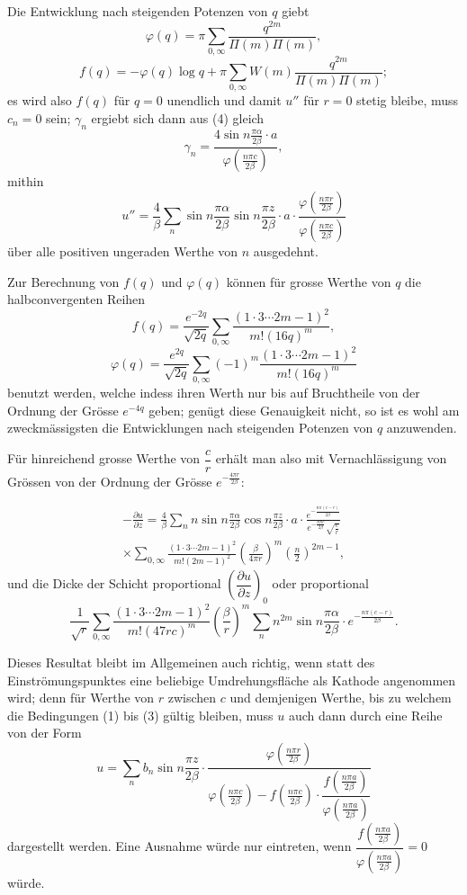 \documentclass[12pt,a4paper]{article}
\begin{document}
Die Entwicklung nach steigenden Potenzen von $q$ giebt
\[
\varphi(q) = \pi \sum_{0,\infty} \frac{q^{2m}}{\Pi(m)\Pi(m)},
\]
\[
f(q) = -\varphi(q) \log q + \pi \sum_{0,\infty} W(m) \frac{q^{2m}}{\Pi(m)\Pi(m)};
\]
es wird also $f(q)$ für $q = 0$ unendlich und damit $u''$ für $r = 0$ stetig bleibe, muss $c_n = 0$ sein; $\gamma_n$ ergiebt sich dann aus (4) gleich
\[
\gamma_n = \frac{4 \sin n\frac{\pi \alpha}{2\beta} \cdot a}{\varphi\left(\frac{n\pi c}{2\beta}\right)},
\]
mithin
\[
u'' = \frac{4}{\beta} \sum_n \sin n\frac{\pi \alpha}{2\beta} \sin n\frac{\pi z}{2\beta} \cdot a \cdot \frac{\varphi\left(\frac{n\pi r}{2\beta}\right)}{\varphi\left(\frac{n\pi c}{2\beta}\right)}
\]
über alle positiven ungeraden Werthe von $n$ ausgedehnt.

Zur Berechnung von $f(q)$ und $\varphi(q)$ können für grosse Werthe von $q$ die halbconvergenten Reihen
\[
f(q) = \frac{e^{-2q}}{\sqrt{2q}} \sum_{0,\infty} \frac{(1 \cdot 3 \cdots 2m - 1)^2}{m! (16q)^m},
\]
\[
\varphi(q) = \frac{e^{2q}}{\sqrt{2q}} \sum_{0,\infty} (-1)^m \frac{(1 \cdot 3 \cdots 2m - 1)^2}{m! (16q)^m}
\]
benutzt werden, welche indess ihren Werth nur bis auf Bruchtheile von der Ordnung der Grösse $e^{-4q}$ geben; genügt diese Genauigkeit nicht, so ist es wohl am zweckmässigsten die Entwicklungen nach steigenden Potenzen von $q$ anzuwenden.

Für hinreichend grosse Werthe von $\dfrac{c}{r}$ erhält man also mit Vernachlässigung von Grössen von der Ordnung der Grösse $e^{-\frac{4\pi r}{2\beta}}$:

\begin{multline*}
-\frac{\partial u}{\partial z} = \frac{4}{\beta} \sum_n n \sin n\frac{\pi \alpha}{2\beta} \cos n\frac{\pi z}{2\beta} \cdot a \cdot \frac{e^{-\frac{n\pi(c-r)}{2\beta}}}{e^{-\frac{n\pi c}{2\beta}} \sqrt{\frac{c}{r}}}\\
\times \sum_{0,\infty} \frac{(1 \cdot 3 \cdots 2m - 1)^2}{m! (2m - 1)^2} \left(\frac{\beta}{4\pi r}\right)^m \left(\frac{n}{2}\right)^{2m-1},
\end{multline*}
und die Dicke der Schicht proportional $\left(\dfrac{\partial u}{\partial z}\right)_0$ oder proportional
\[
\frac{1}{\sqrt{r}} \sum_{0,\infty} \frac{(1 \cdot 3 \cdots 2m - 1)^2}{m! (47rc)^m} \left(\frac{\beta}{r}\right)^m \sum_n n^{2m} \sin n\frac{\pi \alpha}{2\beta} \cdot e^{-\frac{n\pi(c-r)}{2\beta}}.
\]

Dieses Resultat bleibt im Allgemeinen auch richtig, wenn statt des Einströmungspunktes eine beliebige Umdrehungsfläche als Kathode angenommen wird; denn für Werthe von $r$ zwischen $c$ und demjenigen Werthe, bis zu welchem die Bedingungen (1) bis (3) gültig bleiben, muss $u$ auch dann durch eine Reihe von der Form
\[
u = \sum_n b_n \sin n\frac{\pi z}{2\beta} \cdot \frac{\varphi\left(\frac{n\pi r}{2\beta}\right)}{\varphi\left(\frac{n\pi c}{2\beta}\right) - f\left(\frac{n\pi c}{2\beta}\right) \cdot \dfrac{f\left(\frac{n\pi a}{2\beta}\right)}{\varphi\left(\frac{n\pi a}{2\beta}\right)}}
\]
dargestellt werden. Eine Ausnahme würde nur eintreten, wenn $\dfrac{f\left(\frac{n\pi a}{2\beta}\right)}{\varphi\left(\frac{n\pi a}{2\beta}\right)} = 0$ würde.
\end{document}
